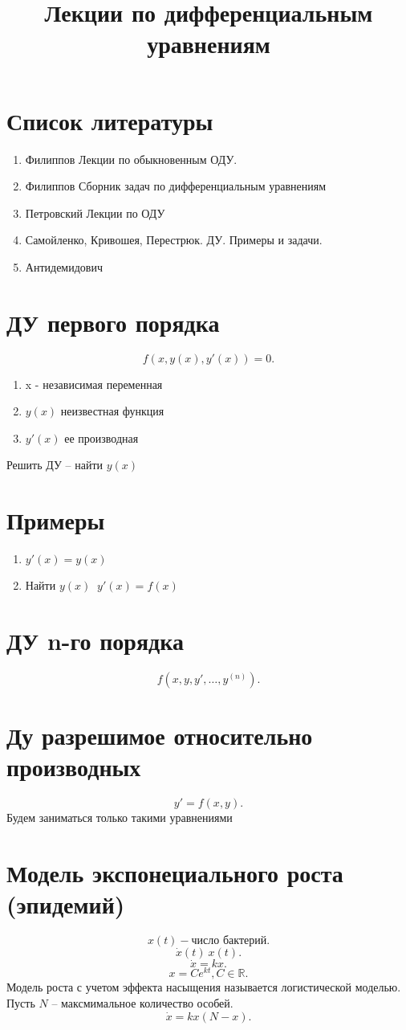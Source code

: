 \documentclass[14pt]{extarticle}
\title{Лекции по дифференциальным уравнениям}
\author{}
\date{}
\begin{document}
\maketitle
\section{Список литературы}
\begin{enumerate}
	\item Филиппов Лекции по обыкновенным ОДУ.
	\item Филиппов Сборник задач по дифференциальным уравнениям
	\item Петровский Лекции по ОДУ
	\item Самойленко, Кривошея, Перестрюк. ДУ. Примеры и задачи.
	\item Антидемидович
\end{enumerate}
\section{ДУ первого порядка}
\[
f(x,y(x),y'(x)) = 0
.\] 
\begin{enumerate}
    \item x - независимая переменная
    \item $y(x)$ неизвестная функция
    \item  $y'(x)$ ее производная
\end{enumerate}
Решить ДУ -- найти $y(x)$ 
\section{Примеры}
\begin{enumerate}
    \item $y'(x) = y(x)$
    \item Найти  $y(x) ~$  $y'(x) = f(x)$
\end{enumerate}
\section{ДУ n-го порядка}
\[
f(x,y,y',\dots,y^{(n)})
.\] 
\section{Ду разрешимое относительно производных}
\[
y' = f(x,y)
.\] 
Будем заниматься только такими уравнениями
\section{Модель экспонециального роста (эпидемий)}
\[
    x(t) - \text{число бактерий}
.\] 
\[
    \dot{x}(t) ~ x(t)
.\] 
\[
    \dot{x} = kx
.\] 
\[
x = C e^{kt}, C \in \mathbb{R}
.\] 
Модель роста с учетом эффекта насыщения называется логистической моделью.\\
Пусть $N$ -- максмимальное количество особей.
 \[
     \dot{x} = kx (N - x)
.\] 
\end{document}
